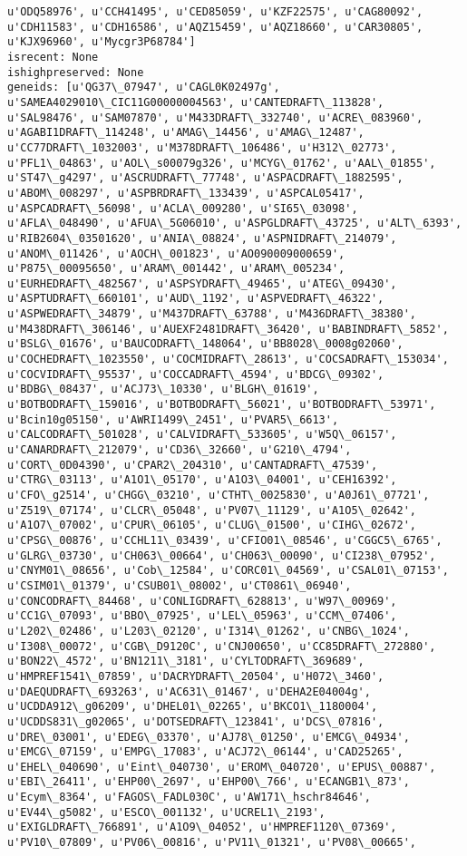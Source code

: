 \documentclass[11pt]{article}
\begin{document}
\begin{Verbatim}[commandchars=\\\{\}]
u'ODQ58976', u'CCH41495', u'CED85059', u'KZF22575', u'CAG80092', u'CDH11583', u'CDH16586', u'AQZ15459', u'AQZ18660', u'CAR30805', u'KJX96960', u'Mycgr3P68784']
isrecent: None
ishighpreserved: None
geneids: [u'QG37\_07947', u'CAGL0K02497g', u'SAMEA4029010\_CIC11G00000004563', u'CANTEDRAFT\_113828', u'SAL98476', u'SAM07870', u'M433DRAFT\_332740', u'ACRE\_083960', u'AGABI1DRAFT\_114248', u'AMAG\_14456', u'AMAG\_12487', u'CC77DRAFT\_1032003', u'M378DRAFT\_106486', u'H312\_02773', u'PFL1\_04863', u'AOL\_s00079g326', u'MCYG\_01762', u'AAL\_01855', u'ST47\_g4297', u'ASCRUDRAFT\_77748', u'ASPACDRAFT\_1882595', u'ABOM\_008297', u'ASPBRDRAFT\_133439', u'ASPCAL05417', u'ASPCADRAFT\_56098', u'ACLA\_009280', u'SI65\_03098', u'AFLA\_048490', u'AFUA\_5G06010', u'ASPGLDRAFT\_43725', u'ALT\_6393', u'RIB2604\_03501620', u'ANIA\_08824', u'ASPNIDRAFT\_214079', u'ANOM\_011426', u'AOCH\_001823', u'AO090009000659', u'P875\_00095650', u'ARAM\_001442', u'ARAM\_005234', u'EURHEDRAFT\_482567', u'ASPSYDRAFT\_49465', u'ATEG\_09430', u'ASPTUDRAFT\_660101', u'AUD\_1192', u'ASPVEDRAFT\_46322', u'ASPWEDRAFT\_34879', u'M437DRAFT\_63788', u'M436DRAFT\_38380', u'M438DRAFT\_306146', u'AUEXF2481DRAFT\_36420', u'BABINDRAFT\_5852', u'BSLG\_01676', u'BAUCODRAFT\_148064', u'BB8028\_0008g02060', u'COCHEDRAFT\_1023550', u'COCMIDRAFT\_28613', u'COCSADRAFT\_153034', u'COCVIDRAFT\_95537', u'COCCADRAFT\_4594', u'BDCG\_09302', u'BDBG\_08437', u'ACJ73\_10330', u'BLGH\_01619', u'BOTBODRAFT\_159016', u'BOTBODRAFT\_56021', u'BOTBODRAFT\_53971', u'Bcin10g05150', u'AWRI1499\_2451', u'PVAR5\_6613', u'CALCODRAFT\_501028', u'CALVIDRAFT\_533605', u'W5Q\_06157', u'CANARDRAFT\_212079', u'CD36\_32660', u'G210\_4794', u'CORT\_0D04390', u'CPAR2\_204310', u'CANTADRAFT\_47539', u'CTRG\_03113', u'A1O1\_05170', u'A1O3\_04001', u'CEH16392', u'CFO\_g2514', u'CHGG\_03210', u'CTHT\_0025830', u'A0J61\_07721', u'Z519\_07174', u'CLCR\_05048', u'PV07\_11129', u'A1O5\_02642', u'A1O7\_07002', u'CPUR\_06105', u'CLUG\_01500', u'CIHG\_02672', u'CPSG\_00876', u'CCHL11\_03439', u'CFIO01\_08546', u'CGGC5\_6765', u'GLRG\_03730', u'CH063\_00664', u'CH063\_00090', u'CI238\_07952', u'CNYM01\_08656', u'Cob\_12584', u'CORC01\_04569', u'CSAL01\_07153', u'CSIM01\_01379', u'CSUB01\_08002', u'CT0861\_06940', u'CONCODRAFT\_84468', u'CONLIGDRAFT\_628813', u'W97\_00969', u'CC1G\_07093', u'BBO\_07925', u'LEL\_05963', u'CCM\_07406', u'L202\_02486', u'L203\_02120', u'I314\_01262', u'CNBG\_1024', u'I308\_00072', u'CGB\_D9120C', u'CNJ00650', u'CC85DRAFT\_272880', u'BON22\_4572', u'BN1211\_3181', u'CYLTODRAFT\_369689', u'HMPREF1541\_07859', u'DACRYDRAFT\_20504', u'H072\_3460', u'DAEQUDRAFT\_693263', u'AC631\_01467', u'DEHA2E04004g', u'UCDDA912\_g06209', u'DHEL01\_02265', u'BKCO1\_1180004', u'UCDDS831\_g02065', u'DOTSEDRAFT\_123841', u'DCS\_07816', u'DRE\_03001', u'EDEG\_03370', u'AJ78\_01250', u'EMCG\_04934', u'EMCG\_07159', u'EMPG\_17083', u'ACJ72\_06144', u'CAD25265', u'EHEL\_040690', u'Eint\_040730', u'EROM\_040720', u'EPUS\_00887', u'EBI\_26411', u'EHP00\_2697', u'EHP00\_766', u'ECANGB1\_873', u'Ecym\_8364', u'FAGOS\_FADL030C', u'AW171\_hschr84646', u'EV44\_g5082', u'ESCO\_001132', u'UCREL1\_2193', u'EXIGLDRAFT\_766891', u'A1O9\_04052', u'HMPREF1120\_07369', u'PV10\_07809', u'PV06\_00816', u'PV11\_01321', u'PV08\_00665', 
\end{Verbatim}
\end{document}
